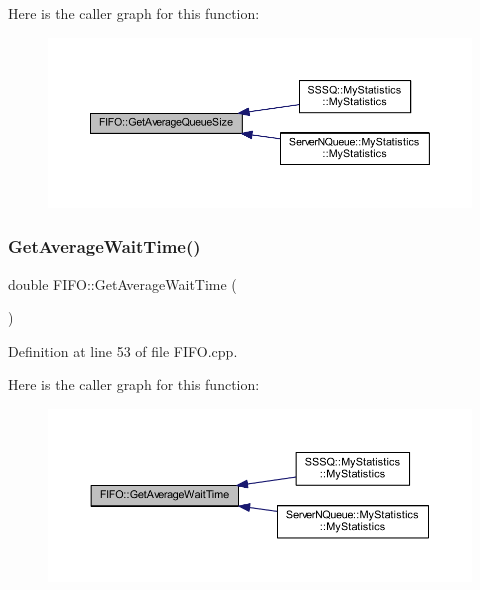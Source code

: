 Here is the caller graph for this function\+:
\nopagebreak
\begin{figure}[H]
\begin{center}
\leavevmode
\includegraphics[width=350pt]{class_f_i_f_o_a739f5e90efc37fcea0f66e5548132d5f_icgraph}
\end{center}
\end{figure}
\mbox{\label{class_f_i_f_o_abf4a95cb154b2bb4eb6bb3750a6fce3d}} 
\subsubsection{\texorpdfstring{Get\+Average\+Wait\+Time()}{GetAverageWaitTime()}}
{\footnotesize\ttfamily double F\+I\+F\+O\+::\+Get\+Average\+Wait\+Time (\begin{DoxyParamCaption}{ }\end{DoxyParamCaption})}



Definition at line 53 of file F\+I\+F\+O.\+cpp.

Here is the caller graph for this function\+:
\nopagebreak
\begin{figure}[H]
\begin{center}
\leavevmode
\includegraphics[width=350pt]{class_f_i_f_o_abf4a95cb154b2bb4eb6bb3750a6fce3d_icgraph}
\end{center}
\end{figure}
\mbox{\label{class_f_i_f_o_a428f7532d582435ee5710641f0f87bfd}} 
